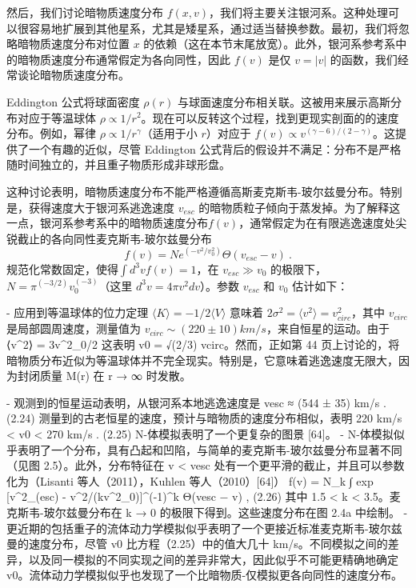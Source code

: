 

然后，我们讨论暗物质速度分布 $f(x, v)$，我们将主要关注银河系。这种处理可以很容易地扩展到其他星系，尤其是矮星系，通过适当替换参数。最初，我们将忽略暗物质速度分布对位置 $x$ 的依赖（这在本节末尾放宽）。此外，银河系参考系中的暗物质速度分布通常假定为各向同性，因此 $f(v)$ 是仅 $v = |v|$ 的函数，我们经常谈论暗物质速度分布。


Eddington 公式将球面密度 $\rho (r)$ 与球面速度分布相关联。这被用来展示高斯分布对应于等温球体 $\rho \propto 1/r^2$。现在可以反转这个过程，找到更现实剖面的的速度分布。例如，幂律 $\rho \propto 1/r^\gamma$（适用于小 $r$）对应于 $f(v) \propto v^{(\gamma-6)/(2-\gamma)}$。这提供了一个有趣的近似，尽管 Eddington 公式背后的假设并不满足：分布不是严格随时间独立的，并且重子物质形成非球形盘。

这种讨论表明，暗物质速度分布不能严格遵循高斯麦克斯韦-玻尔兹曼分布。特别是，获得速度大于银河系逃逸速度 $v_{esc}$ 的暗物质粒子倾向于蒸发掉。为了解释这一点，银河系参考系中的暗物质速度分布$ f(v)$，通常假定为在有限逃逸速度处尖锐截止的各向同性麦克斯韦-玻尔兹曼分布
\begin{equation}
f(v) = N e^{(-v^2/v^2_0)} \Theta (v_{esc} - v)~.
\end{equation}
规范化常数固定，使得$ \int d^3v f(v) = 1$，在 $v_{esc} \gg v_0$ 的极限下，$N = \pi^{(-3/2)}v^{(-3)}_0$（这里 $d^3v = 4\pi v^2 dv$）。参数 $v_{esc}$ 和 $v_0$ 估计如下：

- 应用到等温球体的位力定理 $\langle K\rangle = -1/2\langle V \rangle$ 意味着 $2\sigma^2 = \langle v^2\rangle  = v^2_{circ}$，其中 $v_{circ}$ 是局部圆周速度，测量值为 $v_{circ} \sim (220 \pm 10) km/s$，来自恒星的运动。由于 ⟨v^2⟩ = 3v^2_0/2 这表明 v0 = √(2/3) vcirc。然而，正如第 44 页上讨论的，将暗物质分布近似为等温球体并不完全现实。特别是，它意味着逃逸速度无限大，因为封闭质量 M(r) 在 r → ∞ 时发散。

- 观测到的恒星运动表明，从银河系本地逃逸速度是
vesc ≈ (544 ± 35) km/s . (2.24)
测量到的古老恒星的速度，预计与暗物质的速度分布相似，表明
220 km/s < v0 < 270 km/s . (2.25)
N-体模拟表明了一个更复杂的图景 [64]。
- N-体模拟似乎表明了一个分布，具有凸起和凹陷，与简单的麦克斯韦-玻尔兹曼分布显著不同（见图 2.5）。此外，分布特征在 v < vesc 处有一个更平滑的截止，并且可以参数化为（Lisanti 等人（2011），Kuhlen 等人（2010）[64]）
f(v) = N_k
∫ exp [v^2_(esc) - v^2/(kv^2_0)]^(-1)^k Θ(vesc − v) , (2.26)
其中 1.5 < k < 3.5。麦克斯韦-玻尔兹曼分布在 k → 0 的极限下得到。这些速度分布在图 2.4a 中绘制。
- 更近期的包括重子的流体动力学模拟似乎表明了一个更接近标准麦克斯韦-玻尔兹曼的速度分布，尽管 v0 比方程（2.25）中的值大几十 km/s。不同模拟之间的差异，以及同一模拟的不同实现之间的差异非常大，因此似乎不可能更精确地确定 v0。流体动力学模拟似乎也发现了一个比暗物质-仅模拟更各向同性的速度分布。

